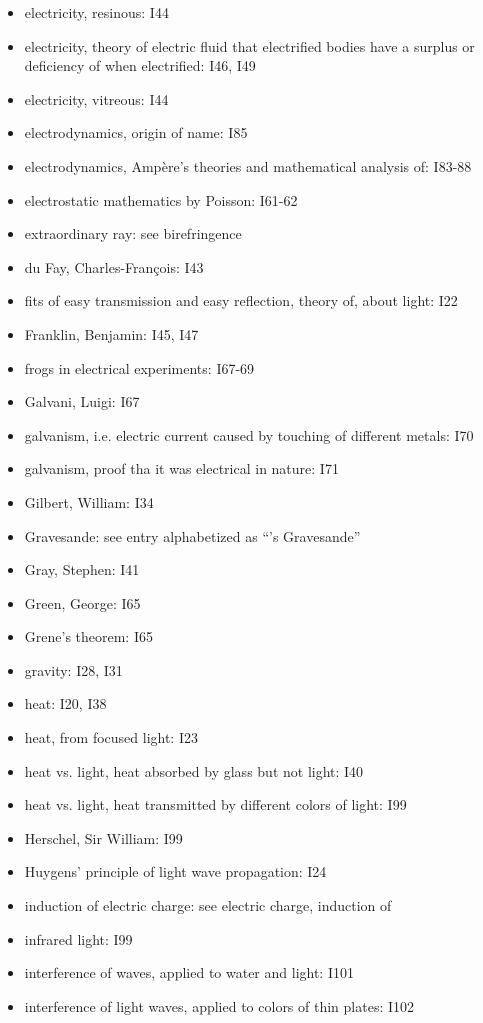 \documentclass[a4paper]{article}
\theoremstyle{plain}
\theoremstyle{definition}
\begin{document}
\begin{itemize}
\item electricity, resinous: I44
\item electricity, theory of electric fluid that electrified bodies have a surplus or deficiency of when electrified: I46, I49
\item electricity, vitreous: I44
\item electrodynamics, origin of name: I85
\item electrodynamics, Amp\`{e}re's theories and mathematical analysis of: I83-88
\item electrostatic mathematics by Poisson: I61-62
\item extraordinary ray: see birefringence
\item du Fay, Charles-Fran\c{c}ois: I43
\item fits of easy transmission and easy reflection, theory of, about light: I22
\item Franklin, Benjamin: I45, I47
\item frogs in electrical experiments: I67-69
\item Galvani, Luigi: I67
\item galvanism, i.e. electric current caused by touching of different metals: I70
\item galvanism, proof tha it was electrical in nature: I71
\item Gilbert, William: I34
\item Gravesande: see entry alphabetized as ``'s Gravesande''
\item Gray, Stephen: I41
\item Green, George: I65
\item Grene's theorem: I65
\item gravity: I28, I31
\item heat: I20, I38
\item heat, from focused light: I23
\item heat vs. light, heat absorbed by glass but not light: I40
\item heat vs. light, heat transmitted by different colors of light: I99
\item Herschel, Sir William: I99
\item Huygens' principle of light wave propagation: I24
\item induction of electric charge: see electric charge, induction of
\item infrared light: I99
\item interference of waves, applied to water and light: I101
\item interference of light waves, applied to colors of thin plates: I102

\end{itemize}
\end{document}
